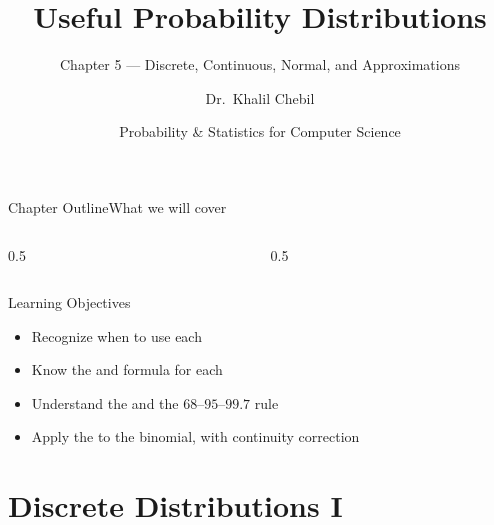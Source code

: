 \documentclass[aspectratio=169,11pt]{beamer}
\title[Ch.\,5 — Distributions]{Useful Probability Distributions}
\subtitle{Chapter 5 — Discrete, Continuous, Normal, and Approximations}
\author{Dr.\ Khalil Chebil}
\date{Probability \& Statistics for Computer Science}
\begin{document}
{
\begin{frame}
  \titlepage
\end{frame}}

\begin{frame}{Chapter Outline}{What we will cover}
  \begin{columns}[T]
    \begin{column}{0.5\textwidth}
      \tableofcontents[sections={1-4}]
    \end{column}
    \begin{column}{0.5\textwidth}
      \tableofcontents[sections={5-8}]
    \end{column}
  \end{columns}
  \vfill
  \begin{block}{Learning Objectives}
    \begin{itemize}
      \item Recognize when to use each 
      \item Know the  and  formula for each
      \item Understand the  and the $68$--$95$--$99.7$ rule
      \item Apply the  to the binomial, with continuity correction
    \end{itemize}
  \end{block}
\end{frame}

\section{Discrete Distributions I}
\end{document}
